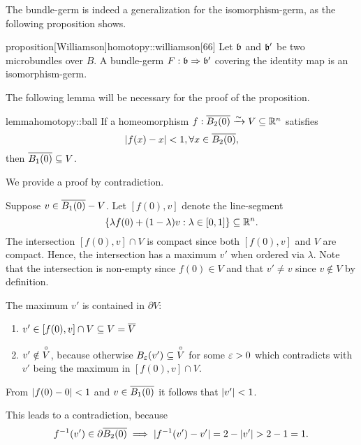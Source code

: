 \begin{myparagraph}
    The bundle-germ is indeed a generalization for the isomorphism-germ,
    as the following proposition shows.
\end{myparagraph}

\begin{mystatement}{proposition}[Williamson]{homotopy::williamson}[66]
    Let $\bb$ and $\bb'$ be two microbundles over $B$.
    A bundle-germ $\germdef{F}{\bb}{\bb'}$ covering
    the identity map is an isomorphism-germ.
\end{mystatement}

\begin{myparagraph}
    The following lemma will be necessary for the proof of the proposition.    
\end{myparagraph}

\begin{mystatement}{lemma}{homotopy::ball}
    If a homeomorphism $f: \clball[2] \isomto V \sub \R^n$ satisfies
    \[ \abs{f(x) - x} < 1, \forall x \in \clball[2], \]
    then $\clball[1] \sub V$.
\end{mystatement}

\begin{myproof}
    We provide a proof by contradiction.

    Suppose $v \in \clball[1] - V$.
    Let $[f(0), v]$ denote the line-segment
    \[ \{\lambda f(0) + (1 - \lambda) v:\lambda \in [0, 1]\} \subseteq{} \mathbb{R}^n. \]
    The intersection $[f(0), v] \cap V$ is compact
    since both $[f(0), v]$ and $V$ are compact.
    Hence, the intersection has a maximum $v'$ when ordered via $\lambda$.
    Note that the intersection is non-empty since $f(0) \in V$
    and that $v' \neq v$ since $v \notin V$ by definition.

    The maximum $v'$ is contained in $\partial V$:
    \begin{enumerate}
        \item $v' \in [f(0), v] \cap V \subseteq{} V = \overline{V}$
        \item $v' \notin \overset{\circ}{V}$, because otherwise
        $\ball[\eps][v'] \sub \inner{V}$ for some $\varepsilon{} > 0$
        which contradicts with $v'$ being the maximum in $[f(0), v] \cap V$.
    \end{enumerate}

    From $\vert{} f(0) - 0 \vert{} < 1$ and $v \in \clball[1]$ it follows that $\vert{} v' \vert{} < 1$. 

    This leads to a contradiction, because
    \[ \inv{f}(v') \in \partial\clball[2] \implies \abs{\inv{f}(v') - v'} = 2 - \abs{v'} > 2 - 1 = 1. \]
\end{myproof}